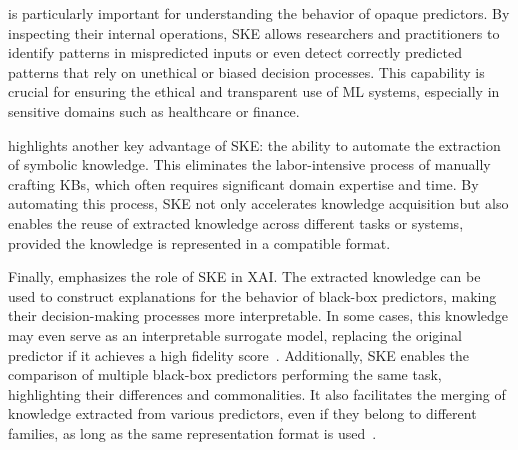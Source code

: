  is particularly important for understanding the behavior of opaque predictors.
%
By inspecting their internal operations, \gls{SKE} allows researchers and practitioners to identify patterns in mispredicted inputs or even detect correctly predicted patterns that rely on unethical or biased decision processes.
%
This capability is crucial for ensuring the ethical and transparent use of \gls{ML} systems, especially in sensitive domains such as healthcare or finance.

 highlights another key advantage of \gls{SKE}: the ability to automate the extraction of symbolic knowledge.
%
This eliminates the labor-intensive process of manually crafting \glspl{KB}, which often requires significant domain expertise and time.
%
By automating this process, \gls{SKE} not only accelerates knowledge acquisition but also enables the reuse of extracted knowledge across different tasks or systems, provided the knowledge is represented in a compatible format.

Finally,  emphasizes the role of \gls{SKE} in \gls{XAI}.
%
The extracted knowledge can be used to construct explanations for the behavior of black-box predictors, making their decision-making processes more interpretable.
%
In some cases, this knowledge may even serve as an interpretable surrogate model, replacing the original predictor if it achieves a high fidelity score~\cite{DBLP:conf/atal/CiattoCSO20}.
%
Additionally, \gls{SKE} enables the comparison of multiple black-box predictors performing the same task, highlighting their differences and commonalities.
%
It also facilitates the merging of knowledge extracted from various predictors, even if they belong to different families, as long as the same representation format is used~\cite{DBLP:conf/aiia/CiattoCOC19}.


